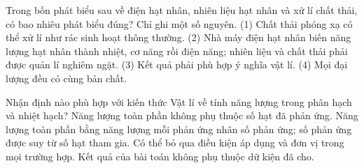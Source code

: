 \begin{ex}
Trong bốn phát biểu sau về điện hạt nhân, nhiên liệu hạt nhân và xử lí chất thải, có bao nhiêu phát biểu đúng? Chỉ ghi một số nguyên. (1) Chất thải phóng xạ có thể xử lí như rác sinh hoạt thông thường. (2) Nhà máy điện hạt nhân biến năng lượng hạt nhân thành nhiệt, cơ năng rồi điện năng; nhiên liệu và chất thải phải được quản lí nghiêm ngặt. (3) Kết quả phải phù hợp ý nghĩa vật lí. (4) Mọi đại lượng đều có cùng bản chất.
\end{ex}

\begin{ex}
Nhận định nào phù hợp với kiến thức Vật lí về tính năng lượng trong phân hạch và nhiệt hạch?
\choice
{Năng lượng toàn phần không phụ thuộc số hạt đã phản ứng.}
{\True Năng lượng toàn phần bằng năng lượng mỗi phản ứng nhân số phản ứng; số phản ứng được suy từ số hạt tham gia.}
{Có thể bỏ qua điều kiện áp dụng và đơn vị trong mọi trường hợp.}
{Kết quả của bài toán không phụ thuộc dữ kiện đã cho.}
\end{ex}

